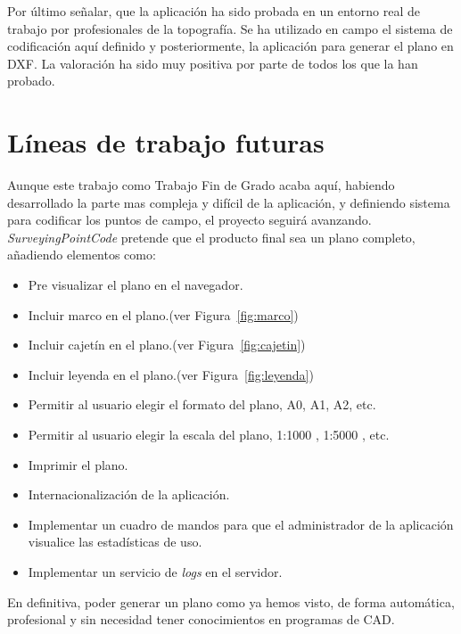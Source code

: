 Por último señalar, que la aplicación ha sido probada en un entorno real de trabajo por profesionales de la topografía. Se ha utilizado en campo el sistema de codificación aquí definido y posteriormente, la aplicación para generar el plano en DXF. La valoración ha sido muy positiva por parte de todos los que la han probado.

\section{Líneas de trabajo futuras}

Aunque este trabajo como Trabajo Fin de Grado acaba aquí, habiendo desarrollado la parte mas compleja y difícil de la aplicación, y definiendo sistema para codificar los puntos de campo, el proyecto seguirá avanzando. \emph{SurveyingPointCode} pretende que el producto final sea un plano completo, añadiendo elementos como:



\begin{itemize}
\item Pre visualizar el plano en el navegador.
\item Incluir marco en el plano.(ver Figura~\ref{fig:marco})
\item Incluir cajetín en el plano.(ver Figura~\ref{fig:cajetin})
\item Incluir leyenda en el plano.(ver Figura~\ref{fig:leyenda})
\item Permitir al usuario elegir el formato del plano, A0, A1, A2, etc.
\item Permitir al usuario elegir la escala del plano, 1:1000 , 1:5000 , etc.
\item Imprimir el plano.
\item Internacionalización de la aplicación.
\item Implementar un cuadro de mandos para que el administrador de la aplicación visualice las estadísticas de uso.
\item Implementar un servicio de \emph{logs} en el servidor.
\end{itemize}


En definitiva, poder generar un plano como ya hemos visto, de forma automática, profesional y sin necesidad tener conocimientos en programas de CAD.
